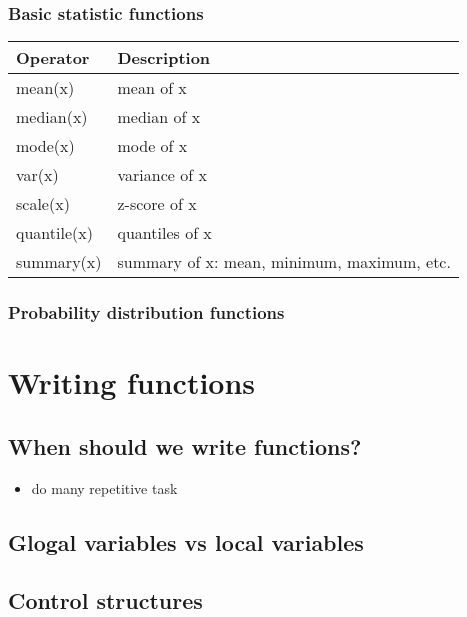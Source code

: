 \documentclass[
]{book}
\providecommand{\tightlist}{%
  \setlength{\itemsep}{0pt}\setlength{\parskip}{0pt}}
\begin{document}
\hypertarget{basic-statistic-functions}{%
\subsection{Basic statistic functions}\label{basic-statistic-functions}}

\begin{longtable}[]{@{}ll@{}}
\toprule
Operator & Description\tabularnewline
\midrule
\endhead
mean(x) & mean of x\tabularnewline
median(x) & median of x\tabularnewline
mode(x) & mode of x\tabularnewline
var(x) & variance of x\tabularnewline
scale(x) & z-score of x\tabularnewline
quantile(x) & quantiles of x\tabularnewline
summary(x) & summary of x: mean, minimum, maximum, etc.\tabularnewline
\bottomrule
\end{longtable}

\hypertarget{probability-distribution-functions}{%
\subsection{Probability distribution functions}\label{probability-distribution-functions}}

\hypertarget{writing-functions}{%
\chapter{Writing functions}\label{writing-functions}}

\hypertarget{when-should-we-write-functions}{%
\section{When should we write functions?}\label{when-should-we-write-functions}}

\begin{itemize}
\tightlist
\item
  do many repetitive task
\end{itemize}

\hypertarget{glogal-variables-vs-local-variables}{%
\section{Glogal variables vs local variables}\label{glogal-variables-vs-local-variables}}

\hypertarget{control-structures}{%
\section{Control structures}\label{control-structures}}
\end{document}
